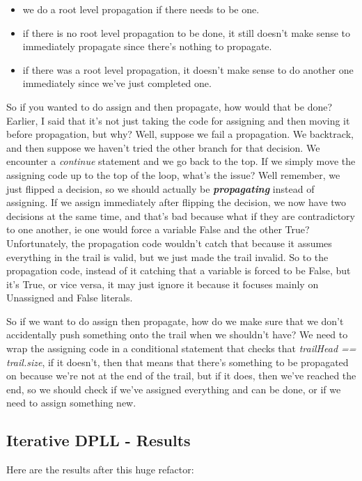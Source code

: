 \documentclass[oneside]{book}
\begin{document}
\begin{itemize}
    \item we do a root level propagation if there needs to be one.
    \item if there is no root level propagation to be done, it still
            doesn't make sense to immediately propagate since there's 
            nothing to propagate.
    \item if there was a root level propagation, it doesn't make sense 
            to do another one immediately since we've just completed one.
\end{itemize}

So if you wanted to do assign and then propagate, how would that be done? 
Earlier, I said that it's not just taking the code for assigning and then 
moving it before propagation, but why? Well, suppose we fail a propagation. 
We backtrack, and then suppose we haven't tried the other branch for that 
decision. We encounter a \textit{continue} statement and we go back to the 
top. If we simply move the assigning code up to the top of the loop,
what's the issue? Well remember, we just flipped a decision, so we should
actually be \textbf{\textit{propagating}} instead of assigning. If we 
assign immediately after flipping the decision, we now have two decisions 
at the same time, and that's bad because what if they are contradictory to 
one another, ie one would force a variable False and the other True? 
Unfortunately, the propagation code wouldn't catch that because it assumes 
everything in the trail is valid, but we just made the trail invalid. So 
to the propagation code, instead of it catching that a variable is forced to be 
False, but it's True, or vice versa, it may just ignore it because it focuses 
mainly on Unassigned and False literals.

So if we want to do assign then propagate, how do we make sure that 
we don't accidentally push something onto the trail when we shouldn't have?
We need to wrap the assigning code in a conditional statement that checks that 
\textit{trailHead == trail.size}, if it doesn't, then that means that there's 
something to be propagated on because we're not at the end of the trail, but 
if it does, then we've reached the end, so we should check if we've assigned 
everything and can be done, or if we need to assign something new.

\subsection{Iterative DPLL - Results}
Here are the results after this huge refactor:
\end{document}
